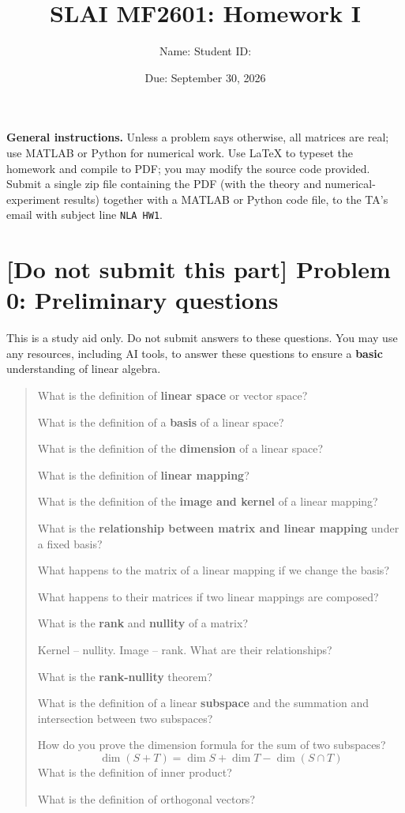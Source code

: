 \documentclass[11pt]{article}
\title{\color{navy}\bfseries SLAI MF2601: Homework I}
\author{Name: \underline{\hspace{6cm}} \quad Student ID: \underline{\hspace{3cm}}}
\date{Due: September 30, 2026}
\begin{document}
\maketitle


\textbf{General instructions.} Unless a problem says otherwise, all matrices are real;
use MATLAB or Python for numerical work. Use \LaTeX{} to typeset the homework and
compile to PDF; you may modify the source code provided. Submit a single zip file
containing the PDF (with the theory and numerical-experiment results) together with
a MATLAB or Python code file, to the TA's email with subject line \texttt{NLA HW1}.

\section*{[Do not submit this part] Problem 0: Preliminary questions}

This is a study aid only. Do not submit answers to these questions.
You may use any resources, including AI tools, to answer these questions to
ensure a \textbf{basic} understanding of linear algebra.

\begin{quote}
What is the definition of \textbf{linear space} or vector space?\par
What is the definition of a \textbf{basis} of a linear space?\par
What is the definition of the \textbf{dimension} of a linear space?\par
What is the definition of \textbf{linear mapping}?\par
What is the definition of the \textbf{image and kernel} of a linear mapping?\par
What is the \textbf{relationship between matrix and linear mapping} under a fixed basis? \par
What happens to the matrix of a linear mapping if we change the basis?\par
What happens to their matrices if two linear mappings are composed?\par
What is the \textbf{rank} and \textbf{nullity} of a matrix?\par
Kernel -- nullity. Image -- rank. What are their relationships?\par
What is the \textbf{rank-nullity} theorem?\par
\par
\medskip
What is the definition of a linear \textbf{subspace} and the summation and intersection
between two subspaces?\par
How do you prove the dimension formula for the sum of two subspaces?
\[
\dim(S+T)=\dim S+\dim T-\dim(S\cap T)
\]
What is the definition of inner product?\par
What is the definition of orthogonal vectors?
\end{quote}
\end{document}
